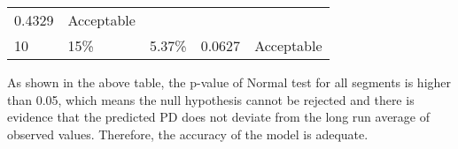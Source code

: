 \begin{longtable}[]{@{}lllll@{}}
\begin{minipage}[t]{0.19\columnwidth}
0.4329\strut
\end{minipage} & \begin{minipage}[t]{0.18\columnwidth}\raggedright
Acceptable\strut
\end{minipage}\tabularnewline
\begin{minipage}[t]{0.12\columnwidth}\raggedright
10\strut
\end{minipage} & \begin{minipage}[t]{0.26\columnwidth}\raggedright
15\%\strut
\end{minipage} & \begin{minipage}[t]{0.12\columnwidth}\raggedright
5.37\%\strut
\end{minipage} & \begin{minipage}[t]{0.19\columnwidth}\raggedright
0.0627\strut
\end{minipage} & \begin{minipage}[t]{0.18\columnwidth}\raggedright
Acceptable\strut
\end{minipage}\tabularnewline
\bottomrule
\end{longtable}

As shown in the above table, the p-value of Normal test for all segments
is higher than 0.05, which means the null hypothesis cannot be rejected
and there is evidence that the predicted PD does not deviate from the
long run average of observed values. Therefore, the accuracy of the
model is adequate.
